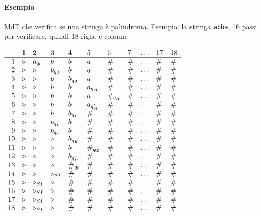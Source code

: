 \documentclass[10pt]{book}
\begin{document}
\paragraph{Esempio} MdT che verifica se una stringa è palindroma. Esempio: la stringa \texttt{abba}, 16 passi per verificare, quindi 18 righe e colonne
\begin{center}
\begin{math}
	\begin{array}{r l l l l l l l l l l}
		 & 1 & 2 & 3 & 4 & 5 & 6 & 7 & \ldots & 17 & 18\\
		\hline
		1 & \triangleright & a_{q_0} & b & b & a & \# & \# & \ldots & \# & \#\\
		2 & \triangleright & \triangleright & b_{q_A} & b & a & \# & \# & \ldots & \# & \#\\
		3 & \triangleright & \triangleright & b & b_{q_A} & a & \# & \# & \ldots & \# & \#\\
		4 & \triangleright & \triangleright & b & b & a_{q_A} & \# & \# & \ldots & \# & \#\\
		5 & \triangleright & \triangleright & b & b & a & \#_{q_A} & \# & \ldots & \# & \#\\
		6 & \triangleright & \triangleright & b & b & a_{q'_A} & \# & \# & \ldots & \# & \#\\
		7 & \triangleright & \triangleright & b & b_{q_1} & \# & \# & \# & \ldots & \# & \#\\
		8 & \triangleright & \triangleright & b_{q_1} & b & \# & \# & \# & \ldots & \# & \#\\
		9 & \triangleright & \triangleright & b_{q_0} & b & \# & \# & \# & \ldots & \# & \#\\
		10 & \triangleright & \triangleright & \triangleright & b_{q_B} & \# & \# & \# & \ldots & \# & \#\\
		11 & \triangleright & \triangleright & \triangleright & b & \#_{q_B} & \# & \# & \ldots & \# & \#\\
		12 & \triangleright & \triangleright & \triangleright & b_{q'_B} & \# & \# & \# & \ldots & \# & \#\\
		13 & \triangleright & \triangleright & \triangleright & \#_{q_0} & \# & \# & \# & \ldots & \# & \#\\
		14 & \triangleright & \triangleright & \triangleright_{SI} & \# & \# & \# & \# & \ldots & \# & \#\\
		15 & \triangleright & \triangleright_{SI} & \triangleright & \# & \# & \# & \# & \ldots & \# & \#\\
		16 & \triangleright & \triangleright_{SI} & \triangleright & \# & \# & \# & \# & \ldots & \# & \#\\
		17 & \triangleright & \triangleright_{SI} & \triangleright & \# & \# & \# & \# & \ldots & \# & \#\\
		18 & \triangleright & \triangleright_{SI} & \triangleright & \# & \# & \# & \# & \ldots & \# & \#\\
	\end{array}
\end{math}
\end{center}
\end{document}
